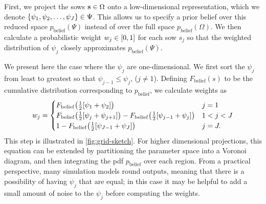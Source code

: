 \documentclass[11pt]{article}
\begin{document}
First, we project the \glspl{sow} $\vb{s} \in \Omega$ onto a low-dimensional representation, which we denote $\qty{\psi_1, \psi_2, \ldots, \psi_J} \in \Psi$.
This allows us to specify a prior belief over this reduced space $p_\mathrm{belief}(\Psi)$ instead of over the full space $p_\mathrm{belief}(\Omega)$.
We then calculate a probabilistic weight $w_j \in \qty[0, 1]$ for each \gls{sow} $s_j$ so that the weighted distribution of $\psi_j$ closely approximates $p_\mathrm{belief}(\Psi)$.

We present here the case where the $\psi_j$ are one-dimensional.
We first sort the $\psi_j$  from least to greatest so that $\psi_{j-1} \leq \psi_j$, ($j \neq 1$).
Defining $F_\mathrm{belief}(s)$ to be the cumulative distribution corresponding to $p_\mathrm{belief}$, we calculate weights as
\begin{equation}\label{eq:weights}
    w_j = \begin{cases}
        F_\mathrm{belief}\qty(\frac{1}{2}\qty[\psi_1 + \psi_2])                                                                     & j = 1     \\
        F_\mathrm{belief}\qty(\frac{1}{2}\qty[\psi_{j} + \psi_{j+1}]) - F_\mathrm{belief}\qty(\frac{1}{2}\qty[\psi_{j-1} + \psi_j]) & 1 < j < J \\
        1 - F_\mathrm{belief}\qty(\frac{1}{2}\qty[\psi_{J-1} + \psi_J])                                                             & j = J.
    \end{cases}
\end{equation}
This step is illustrated in \cref{fig:grid-sketch}.
For higher dimensional projections, this equation can be extended by partitioning the parameter space into a Voronoi diagram, and then integrating the \gls{pdf} $p_\mathrm{belief}$ over each region.
From a practical perspective, many simulation models round outputs, meaning that there is a possibility of having $\psi_j$ that are equal; in this case it may be helpful to add a small amount of noise to the $\psi_j$ before computing the weights.
\end{document}
